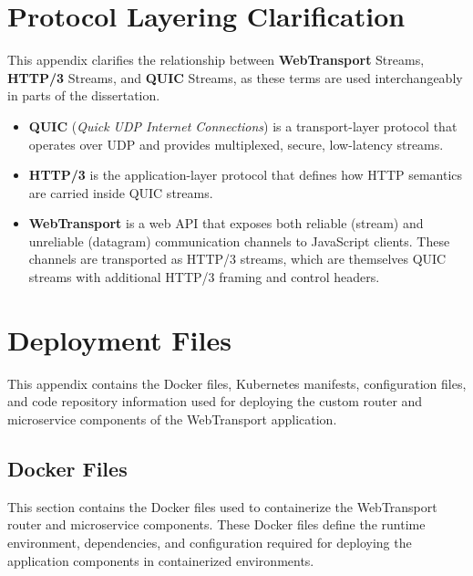 \chapter{Protocol Layering Clarification}

This appendix clarifies the relationship between \textbf{WebTransport} Streams, \textbf{HTTP/3} Streams, and \textbf{QUIC} Streams, as these terms are used interchangeably in parts of the dissertation.

\begin{itemize}
  \item \textbf{QUIC} (\emph{Quick UDP Internet Connections}) is a transport-layer protocol that operates over UDP and provides multiplexed, secure, low-latency streams.
  \item \textbf{HTTP/3} is the application-layer protocol that defines how HTTP semantics are carried inside QUIC streams.
  \item \textbf{WebTransport} is a web API that exposes both reliable (stream) and unreliable (datagram) communication channels to JavaScript clients. These channels are transported as HTTP/3 streams, which are themselves QUIC streams with additional HTTP/3 framing and control headers.
\end{itemize}


\chapter{Deployment Files}
This appendix contains the Docker files, Kubernetes manifests, configuration files, and code repository information used for deploying the custom router and microservice components of the WebTransport application.

\section{Docker Files}

This section contains the Docker files used to containerize the WebTransport router and microservice components. These Docker files define the runtime environment, dependencies, and configuration required for deploying the application components in containerized environments.

